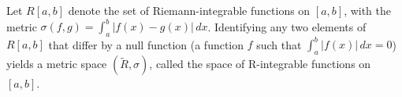 Let $R[a,b]$ denote the set of Riemann-integrable functions on $[a,b]$, with the metric $\sigma(f, g) = \int_a^b |f(x) - g(x)| \, dx$. Identifying any two elements of $R[a,b]$ that differ by a null function (a function $f$ such that $\int_a^b|f(x)| \, dx = 0$) yields a metric space $(\tilde{R}, \sigma)$, called the space of R-integrable functions on $[a,b]$.
